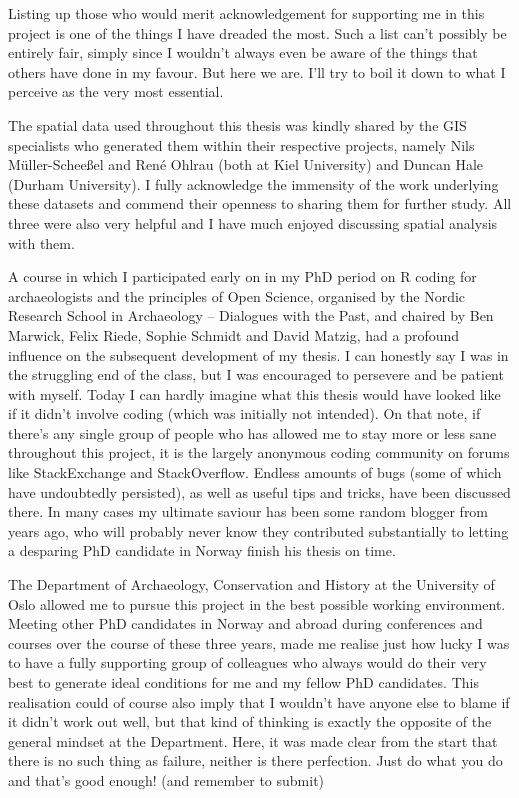 \documentclass[
  12pt,
  a4paper, twoside]{book}
\begin{document}
Listing up those who would merit acknowledgement for supporting me in this project is one of the things I have dreaded the most. Such a list can't possibly be entirely fair, simply since I wouldn't always even be aware of the things that others have done in my favour. But here we are. I'll try to boil it down to what I perceive as the very most essential.

The spatial data used throughout this thesis was kindly shared by the GIS specialists who generated them within their respective projects, namely Nils Müller-Scheeßel and René Ohlrau (both at Kiel University) and Duncan Hale (Durham University). I fully acknowledge the immensity of the work underlying these datasets and commend their openness to sharing them for further study. All three were also very helpful and I have much enjoyed discussing spatial analysis with them.

A course in which I participated early on in my PhD period on R coding for archaeologists and the principles of Open Science, organised by the Nordic Research School in Archaeology -- Dialogues with the Past, and chaired by Ben Marwick, Felix Riede, Sophie Schmidt and David Matzig, had a profound influence on the subsequent development of my thesis. I can honestly say I was in the struggling end of the class, but I was encouraged to persevere and be patient with myself. Today I can hardly imagine what this thesis would have looked like if it didn't involve coding (which was initially not intended). On that note, if there's any single group of people who has allowed me to stay more or less sane throughout this project, it is the largely anonymous coding community on forums like StackExchange and StackOverflow. Endless amounts of bugs (some of which have undoubtedly persisted), as well as useful tips and tricks, have been discussed there. In many cases my ultimate saviour has been some random blogger from years ago, who will probably never know they contributed substantially to letting a desparing PhD candidate in Norway finish his thesis on time.

The Department of Archaeology, Conservation and History at the University of Oslo allowed me to pursue this project in the best possible working environment. Meeting other PhD candidates in Norway and abroad during conferences and courses over the course of these three years, made me realise just how lucky I was to have a fully supporting group of colleagues who always would do their very best to generate ideal conditions for me and my fellow PhD candidates. This realisation could of course also imply that I wouldn't have anyone else to blame if it didn't work out well, but that kind of thinking is exactly the opposite of the general mindset at the Department. Here, it was made clear from the start that there is no such thing as failure, neither is there perfection. Just do what you do and that's good enough! (and remember to submit)
\end{document}
